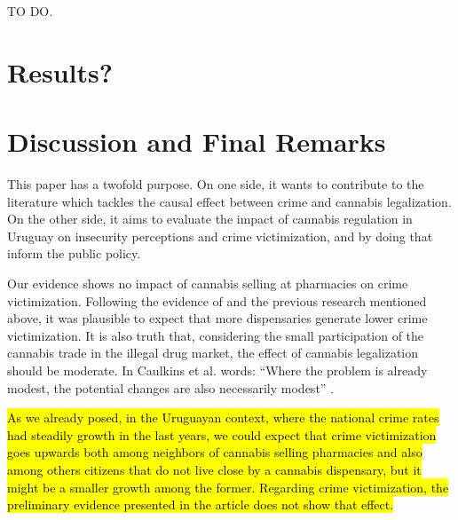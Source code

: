 \documentclass[11pt]{article}
\begin{document}
TO DO.

\section{Results?}

\section{Discussion and Final Remarks}
This paper has a twofold purpose. On one side, it wants to contribute to the literature which tackles the causal effect between crime and cannabis legalization. On the other side, it aims to evaluate the impact of cannabis regulation in Uruguay on insecurity perceptions and crime victimization, and by doing that inform the public policy.

Our evidence shows no impact of cannabis selling at pharmacies on crime victimization. Following the evidence of \citet{dragone2019crime} and the previous research mentioned above, it was plausible to expect that more dispensaries generate lower crime victimization. It is also truth that, considering the small participation of the cannabis trade in the illegal drug market, the effect of cannabis legalization should be moderate. In Caulkins et al. words: ``Where the problem is already modest, the potential changes are also necessarily modest'' \citep[154]{caulkins2015considering}.

\hl{As we already posed, in the Uruguayan context, where the national crime rates had steadily growth in the last years, we could expect that crime victimization goes upwards both among neighbors of cannabis selling pharmacies and also among others citizens that do not live close by a cannabis dispensary, but it might be a smaller growth among the former. Regarding crime victimization, the preliminary evidence presented in the article does not show that effect.}
\end{document}
